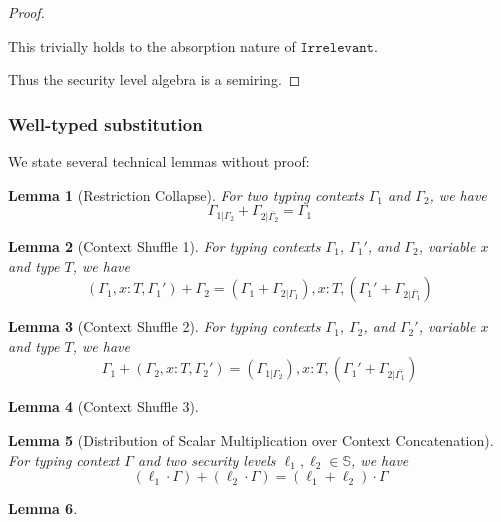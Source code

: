 \documentclass[conference]{IEEEtran}
\newcommand\irrele{\texttt{Irrelevant}}
\newcommand\secure{\mathbb{S}}
\newtheorem{lemma}{Lemma}
\begin{document}
\begin{proof}
\begin{itemize}
		This trivially holds to the absorption nature of $\irrele$.
	\end{itemize}
	Thus the security level algebra is a semiring.
\end{proof}

\subsubsection{Well-typed substitution}
We state several technical lemmas without proof:
\begin{lemma}[Restriction Collapse]
	For two typing contexts $\Gamma_1$ and $\Gamma_2$, we have
	$$
	\Gamma_{1|\Gamma_2}+\Gamma_{2|\overline{\Gamma_2}}=\Gamma_1
	$$
\end{lemma}
\begin{lemma}[Context Shuffle 1]
	For typing contexts $\Gamma_1$, $\Gamma_1'$, and $\Gamma_2$, variable $x$ and type $T$, we have
	$$
	(\Gamma_1,x:T,\Gamma_1')+\Gamma_2=(\Gamma_1+\Gamma_{2|\Gamma_1}),x:T,(\Gamma_1'+\Gamma_{2|\overline{\Gamma_1}})
	$$
\end{lemma}
\begin{lemma}[Context Shuffle 2]
	For typing contexts $\Gamma_1$, $\Gamma_2$, and $\Gamma_2'$, variable $x$ and type $T$, we have
	$$
	\Gamma_1+(\Gamma_2,x:T,\Gamma_2')=(\Gamma_{1|\Gamma_2}),x:T,(\Gamma_1'+\Gamma_{2|\overline{\Gamma_1}})
	$$
\end{lemma}
\begin{lemma}[Context Shuffle 3]
	
\end{lemma}
\begin{lemma}[Distribution of Scalar Multiplication over Context Concatenation]
	For typing context $\Gamma$ and two security levels $\ell_1,\ell_2\in\secure$, we have
	$$
	(\ell_1\cdot\Gamma)+(\ell_2\cdot\Gamma)=(\ell_1+\ell_2)\cdot\Gamma
	$$
\end{lemma}
\begin{lemma}
	
\end{lemma}
\end{document}
